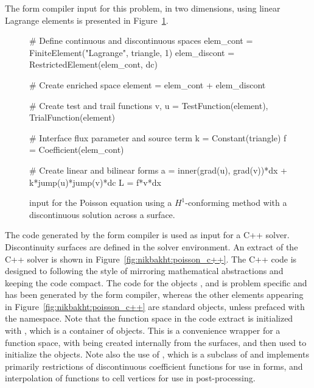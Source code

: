 The form compiler input for this problem, in two dimensions, using linear
Lagrange elements is presented in Figure~\ref{code:nikbakht:Poisson}.
%
\begin{figure}
\begin{python}
# Define continuous and discontinuous spaces
elem_cont    = FiniteElement("Lagrange", triangle, 1)
elem_discont = RestrictedElement(elem_cont, dc)

# Create enriched space
element = elem_cont + elem_discont

# Create test and trail functions
v, u = TestFunction(element), TrialFunction(element)

# Interface flux parameter and source term
k = Constant(triangle)
f = Coefficient(elem_cont)

# Create linear and bilinear forms
a = inner(grad(u), grad(v))*dx + k*jump(u)*jump(v)*dc
L = f*v*dx
\end{python}
\caption{{\ufl} input for the Poisson equation using a $H^{1}$-conforming
method with a discontinuous solution across a surface.}
\label{code:nikbakht:Poisson}
\end{figure}
The code generated by the form compiler is used as input for a C++
solver. Discontinuity surfaces are defined in the solver environment.
An extract of the C++ solver is shown in
Figure~\ref{fig:nikbakht:poisson_c++}.  The C++ code is designed to
following the {\dolfin} style of mirroring mathematical abstractions
and keeping the code compact.  The code for the objects
,  and
 is problem specific and has been generated
by the form compiler, whereas the other elements appearing in
Figure~\ref{fig:nikbakht:poisson_c++} are standard {\dolfin} objects,
unless prefaced with the  namespace. Note that the function
space in the code extract is initialized with , which is
a container of  objects. This is a convenience
wrapper for a \ufc{} function space, with  being
created internally from the surfaces, and then used to initialize the
\ufc{} objects.  Note also the use of , which is a
subclass of  and implements primarily
restrictions of discontinuous coefficient functions for use in forms,
and interpolation of functions to cell vertices for use in
post-processing.
%
